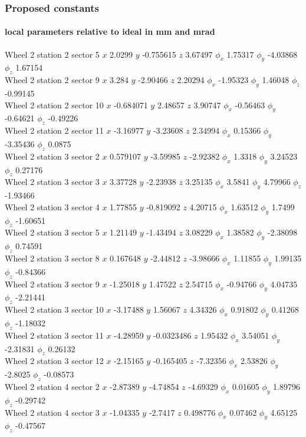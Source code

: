 \documentclass[compress]{beamer}
\begin{document}
\begin{frame}
\frametitle{Proposed constants}
\framesubtitle{local parameters relative to ideal in mm and mrad}

\tiny

Wheel 2 station 2 sector 5 $x$ 2.0299 $y$ -0.755615 $z$ 3.67497 $\phi_x$ 1.75317 $\phi_y$ -4.03868 $\phi_z$ 1.67154 \\
Wheel 2 station 2 sector 9 $x$ 3.284 $y$ -2.90466 $z$ 2.20294 $\phi_x$ -1.95323 $\phi_y$ 1.46048 $\phi_z$ -0.99145 \\
Wheel 2 station 2 sector 10 $x$ -0.684071 $y$ 2.48657 $z$ 3.90747 $\phi_x$ -0.56463 $\phi_y$ -0.64621 $\phi_z$ -0.49226 \\
Wheel 2 station 2 sector 11 $x$ -3.16977 $y$ -3.23608 $z$ 2.34994 $\phi_x$ 0.15366 $\phi_y$ -3.35436 $\phi_z$ 0.0875 \\
Wheel 2 station 3 sector 2 $x$ 0.579107 $y$ -3.59985 $z$ -2.92382 $\phi_x$ 1.3318 $\phi_y$ 3.24523 $\phi_z$ 0.27176 \\
Wheel 2 station 3 sector 3 $x$ 3.37728 $y$ -2.23938 $z$ 3.25135 $\phi_x$ 3.5841 $\phi_y$ 4.79966 $\phi_z$ -1.93466 \\
Wheel 2 station 3 sector 4 $x$ 1.77855 $y$ -0.819092 $z$ 4.20715 $\phi_x$ 1.63512 $\phi_y$ 1.7499 $\phi_z$ -1.60651 \\
Wheel 2 station 3 sector 5 $x$ 1.21149 $y$ -1.43494 $z$ 3.08229 $\phi_x$ 1.38582 $\phi_y$ -2.38098 $\phi_z$ 0.74591 \\
Wheel 2 station 3 sector 8 $x$ 0.167648 $y$ -2.44812 $z$ -3.98666 $\phi_x$ 1.11855 $\phi_y$ 1.99135 $\phi_z$ -0.84366 \\
Wheel 2 station 3 sector 9 $x$ -1.25018 $y$ 1.47522 $z$ 2.54715 $\phi_x$ -0.94766 $\phi_y$ 4.04735 $\phi_z$ -2.21441 \\
Wheel 2 station 3 sector 10 $x$ -3.17488 $y$ 1.56067 $z$ 4.34326 $\phi_x$ 0.91802 $\phi_y$ 0.41268 $\phi_z$ -1.18032 \\
Wheel 2 station 3 sector 11 $x$ -4.28959 $y$ -0.0323486 $z$ 1.95432 $\phi_x$ 3.54051 $\phi_y$ -2.31831 $\phi_z$ 0.26132 \\
Wheel 2 station 3 sector 12 $x$ -2.15165 $y$ -0.165405 $z$ -7.32356 $\phi_x$ 2.53826 $\phi_y$ -2.8025 $\phi_z$ -0.08573 \\
Wheel 2 station 4 sector 2 $x$ -2.87389 $y$ -4.74854 $z$ -4.69329 $\phi_x$ 0.01605 $\phi_y$ 1.89796 $\phi_z$ -0.29742 \\
Wheel 2 station 4 sector 3 $x$ -1.04335 $y$ -2.7417 $z$ 0.498776 $\phi_x$ 0.07462 $\phi_y$ 4.65125 $\phi_z$ -0.47567 \\

\end{frame}
\end{document}

